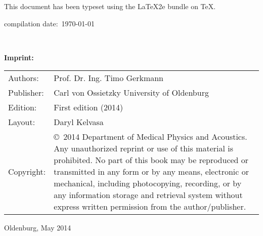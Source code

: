
\newpage
This document has been typeset using the \LaTeX2e bundle on \TeX . \hfill

compilation date:~\today


~\vfill
\thispagestyle{empty}





\sffamily 
\textbf{Imprint:}
\normalfont

\vspace{0.1cm}

\hrulefill

\begin{table}[h]
		\begin{tabular}{p{3cm}p{12cm}}
		Authors:&Prof. Dr. Ing. Timo Gerkmann\\
		Publisher:&Carl von Ossietzky University of Oldenburg\\
		Edition:&First edition (2014)\\
		Layout:&Daryl Kelvasa\\
		Copyright:& \copyright\ 2014 Department of Medical Physics and Acoustics. Any unauthorized reprint or use of this material is prohibited. No part of this book may be reproduced or transmitted in any form or by any means, electronic or mechanical, including photocopying, recording, or by any information storage and retrieval system without express written permission from the author/publisher.\\
		\end{tabular}
\end{table}

\hrulefill

\vspace{1cm}

Oldenburg, May 2014


\clearpage